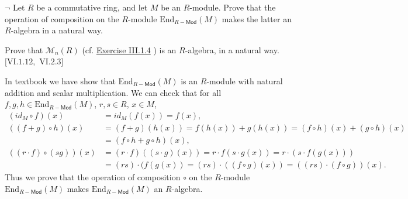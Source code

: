\documentclass[12pt,letterpaper,boxed]{hmcpset}
\begin{document}
\begin{problem}[5.9]
	$\neg$ Let $R$ be a commutative ring, and let $M$ be an $R$-module. Prove that the operation of composition on the $R$-module $\mathrm{End}_{R-\mathsf{Mod}}(M)$ makes the latter an $R$-algebra in a natural way.
	
	Prove that $\mathcal{M}_{n}(R)$ (cf. \hyperlink{Exercise III.1.4}{Exercise III.1.4} ) is an $R$-algebra, in a natural way. $[\mathrm{VI} .1 .12,$ $\mathrm{VI} .2 .3]$
\end{problem}
\begin{solution}
	In textbook we have show that $\mathrm{End}_{R-\mathsf{Mod}}(M)$ is an $R$-module with natural addition and scalar multiplication.
	We can check that for all $f,g,h\in\mathrm{End}_{R-\mathsf{Mod}}(M)$, $r,s\in R$, $x\in M$,
	\begin{align*}
	(id_M\circ f)(x)&=id_M(f(x))=f(x),\\
	((f+g)\circ h)(x)&=(f+g)(h(x))=f(h(x))+g(h(x))=(f\circ h)(x)+(g\circ h)(x)\\
	&=(f\circ h+g\circ h)(x),\\
	((r\cdot f)\circ(sg))(x)&=(r\cdot f)((s\cdot g)(x))=r\cdot f(s\cdot g(x))=r\cdot (s\cdot f(g(x)))\\
	&=(rs) \cdot(f(g(x))=(rs) \cdot((f\circ g)(x))=((rs) \cdot(f\circ g))(x).
	\end{align*}
	Thus we prove that the operation of composition $\circ$ on the $R$-module $\mathrm{End}_{R-\mathsf{Mod}}(M)$ makes $\mathrm{End}_{R-\mathsf{Mod}}(M)$ an $R$-algebra.
	

\end{solution}
\end{document}
